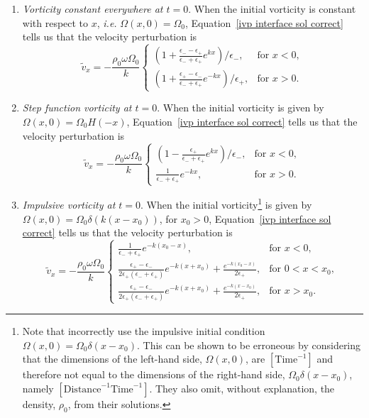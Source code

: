 \documentclass[12pt]{../style-files/ociamthesis}
\begin{document}
\begin{enumerate}
	\item \label{IC1} \textit{Vorticity constant everywhere at $t = 0$}. When the initial vorticity is constant with respect to $x$, \textit{i.e.} $\Omega(x,0) = \Omega_0$, Equation~\eqref{ivp interface sol correct} tells us that the velocity perturbation is	\begin{equation}
	\tilde{v}_x = -\frac{\rho_0\omega\Omega_0}{k}
	\begin{cases}
	\left(1 + \frac{\epsilon_- - \epsilon_+}{\epsilon_- + \epsilon_+}e^{kx}\right)/\epsilon_-, & \text{for } x<0, \\
	\left(1 + \frac{\epsilon_+ - \epsilon_-}{\epsilon_- + \epsilon_+}e^{-kx}\right)/\epsilon_+, & \text{for } x>0.
	\end{cases}
	\end{equation}
	\item \label{IC2} \textit{Step function vorticity at $t = 0$}. When the initial vorticity is given by $\Omega(x,0) = \Omega_0H(-x)$, Equation~\eqref{ivp interface sol correct} tells us that the velocity perturbation is
	\begin{equation}
	\tilde{v}_x = -\frac{\rho_0\omega\Omega_0}{k}
	\begin{cases}
	\left(1 - \frac{\epsilon_+}{\epsilon_- + \epsilon_+}e^{kx}\right)/\epsilon_-, & \text{for } x<0, \\
	\frac{1}{\epsilon_- + \epsilon_+}e^{-kx}, & \text{for } x>0.
	\end{cases}
	\end{equation}
	\item  \label{IC3} \textit{Impulsive vorticity at $t = 0$}. When the initial vorticity\footnote{Note that \cite{rae_etal81} incorrectly use the impulsive initial condition $\Omega(x,0) = \Omega_0\delta(x-x_0)$. This can be shown to be erroneous by considering that the dimensions of the left-hand side, $\Omega(x,0)$, are $[\mathrm{Time}^{-1}]$ and therefore not equal to the dimensions of the right-hand side, $\Omega_0\delta(x-x_0)$, namely $[\mathrm{Distance}^{-1}\mathrm{Time}^{-1}]$. They also omit, without explanation, the density, $\rho_0$, from their solutions.} is given by {$\Omega(x,0) = \Omega_0\delta(k(x-x_0))$}, for $x_0>0$, Equation~\eqref{ivp interface sol correct} tells us that the velocity perturbation is
	\begin{equation}
	\tilde{v}_x = -\frac{\rho_0\omega\Omega_0}{k}
	\begin{cases}
	\frac{1}{\epsilon_- + \epsilon_+}e^{-k(x_0 - x)}, & \text{for } x < 0, \\
	\frac{\epsilon_+ - \epsilon_-}{2\epsilon_+(\epsilon_- + \epsilon_+)}e^{-k(x + x_0)} + \frac{e^{-k(x_0 - x)}}{2\epsilon_+}, & \text{for } 0<x<x_0, \\
	\frac{\epsilon_+ - \epsilon_-}{2\epsilon_+(\epsilon_- + \epsilon_+)}e^{-k(x + x_0)} + \frac{e^{-k(x - x_0)}}{2\epsilon_+}, & \text{for } x>x_0.
	\end{cases}
	\end{equation}
\end{enumerate}
\end{document}

